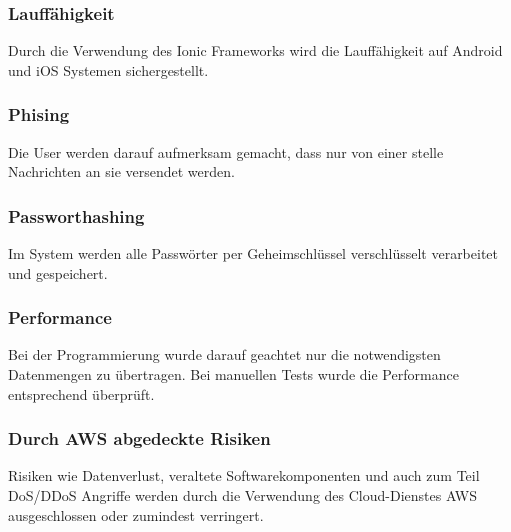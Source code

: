 \subsubsection{Lauffähigkeit}
Durch die Verwendung des Ionic Frameworks wird die Lauffähigkeit auf Android und iOS Systemen sichergestellt.
\subsubsection{Phising}
Die User werden darauf aufmerksam gemacht, dass nur von einer stelle Nachrichten an sie versendet werden. 
\subsubsection{Passworthashing}
Im System werden alle Passwörter per Geheimschlüssel verschlüsselt verarbeitet und gespeichert.
\subsubsection{Performance}
Bei der Programmierung wurde darauf geachtet nur die notwendigsten Datenmengen zu übertragen. Bei manuellen Tests wurde die Performance entsprechend überprüft.
\subsubsection{Durch AWS abgedeckte Risiken}
Risiken wie Datenverlust, veraltete Softwarekomponenten und auch zum Teil DoS/DDoS Angriffe werden durch die Verwendung des Cloud-Dienstes AWS ausgeschlossen oder zumindest verringert.